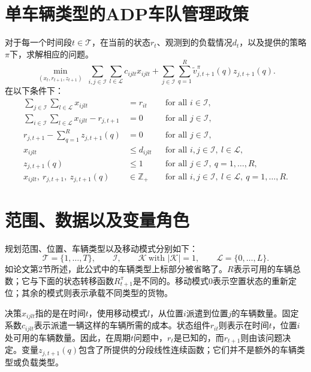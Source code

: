 \documentclass{article}
\begin{document}
\section*{单车辆类型的ADP车队管理政策}

对于每一个时间段$t\in\mathcal T$，在当前的状态$r_t$、观测到的负载情况$d_t$，以及提供的策略$\pi$下，求解相应的问题。
\begin{equation}
\min_{(x_t,r_{t+1},z_{t+1})}\;
\sum_{i,j\in\mathcal I}\sum_{l\in\mathcal L}c_{ijlt}x_{ijlt}
+\sum_{j\in\mathcal I}\sum_{q=1}^{R}\tilde v^\pi_{j,t+1}(q)z_{j,t+1}(q).
\tag{11}
\end{equation}
在以下条件下：
\begin{align}
\sum_{j\in\mathcal I}\sum_{l\in\mathcal L}x_{ijlt}
&=r_{it} &&\text{for all }i\in\mathcal I,\tag{12}\\
\sum_{i\in\mathcal I}\sum_{l\in\mathcal L}x_{ijlt}-r_{j,t+1}
&=0 &&\text{for all }j\in\mathcal I,\tag{13}\\
r_{j,t+1}-\sum_{q=1}^{R}z_{j,t+1}(q)
&=0 &&\text{for all }j\in\mathcal I,\tag{14}\\
x_{ijlt}&\leq d_{ijlt} &&\text{for all }i,j\in\mathcal I,\ l\in\mathcal L,\tag{15}\\
z_{j,t+1}(q)&\leq 1 &&\text{for all }j\in\mathcal I,\ q=1,\ldots,R,\tag{16}\\
x_{ijlt},\ r_{j,t+1},\ z_{j,t+1}(q)&\in\mathbb Z_+
&&\text{for all }i,j\in\mathcal I,\ l\in\mathcal L,\ q=1,\ldots,R.
\tag{17}
\end{align}

\section*{范围、数据以及变量角色}

规划范围、位置、车辆类型以及移动模式分别如下：
\[
\mathcal T=\{1,\ldots,T\},\qquad
\mathcal I,\qquad
\mathcal K\ \text{with }|\mathcal K|=1,\qquad
\mathcal L=\{0,\ldots,L\}.
\]
如论文第2节所述，此公式中的车辆类型上标部分被省略了。$R$表示可用的车辆总数；它与下面的状态转移函数$R^\pi_{t+1}$是不同的。移动模式$0$表示空置状态的重新定位；其余的模式则表示承载不同类型的货物。

决策$x_{ijlt}$指的是在时间$t$，使用移动模式$l$，从位置$i$派遣到位置$j$的车辆数量。固定系数$c_{ijlt}$表示派遣一辆这样的车辆所需的成本。状态组件$r_{it}$则表示在时间$t$，位置$i$处可用的车辆数量。因此，在周期$t$问题中，$r_t$是已知的，而$r_{t+1}$则由该问题决定。变量$z_{j,t+1}(q)$包含了所提供的分段线性连续函数；它们并不是额外的车辆类型或负载类型。
\end{document}
